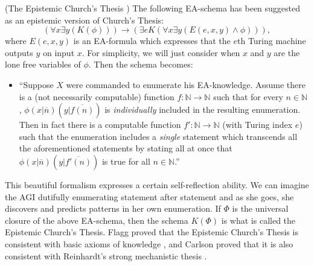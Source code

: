 \documentclass[runningheads]{llncs}
\begin{document}
\begin{example}
\label{ectexample}
  (The Epistemic Church's Thesis \cite{flagg1985church} \cite{carlson2016collapsing})
  The following EA-schema has been suggested as an epistemic version
  of Church's Thesis:
  \[
  ( \forall x\exists y (K(\phi))  ) \rightarrow
  ( \exists e K( \forall x\exists y ( E(e,x,y) \wedge \phi  )  )  ),
  \]
  where $E(e,x,y)$ is an EA-formula which expresses that the $e$th Turing machine
  outputs $y$ on input $x$.
  For simplicity, we will just consider when $x$ and $y$ are the lone free variables
  of $\phi$.
  Then the schema becomes:
  \begin{itemize}
    \item
    ``Suppose $X$ were commanded to enumerate his EA-knowledge.
    Assume there is a (not necessarily computable) function
    $f:\mathbb N\to\mathbb N$ such that for every $n\in\mathbb N$,
    $\phi(x|\overline n)(y|\overline{f(n)})$ is \emph{individually}
    included in the resulting enumeration.
    Then in fact there is a computable
    function $f':\mathbb N\to\mathbb N$ (with Turing index $e$)
    such that the enumeration includes
    a \emph{single} statement which transcends all the aforementioned statements
    by stating all at once that $\phi(x|\overline n)(y|\overline{f'(n)})$
    is true for all $n\in\mathbb N$.''
  \end{itemize}
  This beautiful formalism expresses a certain self-reflection ability.
  We can imagine the AGI dutifully enumerating statement after statement and
  as she goes, she discovers and predicts patterns in her own enumeration.
  If $\Phi$ is the universal closure of the above EA-schema, then the
  schema $K(\Phi)$ is what is called
  the Epistemic Church's Thesis.
  Flagg proved that the Epistemic Church's Thesis is
  consistent with basic axioms of knowledge \cite{flagg1985church},
  and Carlson proved that it is also consistent with
  Reinhardt's strong mechanistic thesis \cite{carlson2016collapsing}.
\end{example}
\end{document}
